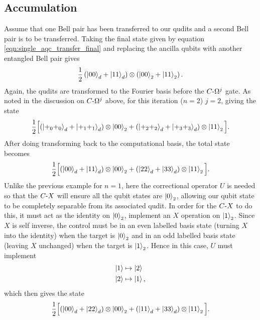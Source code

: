 \subsection{Accumulation}
\label{subsection:accumulation}
Assume that one Bell pair has been transferred to our qudits and a second Bell pair is to be transferred.
Taking the final state given by equation \ref{eqn:single_aqc_transfer_final} and replacing the ancilla qubits with another entangled Bell pair gives
\begin{equation}
    \frac{1}{2}\left(
            \ket{00}_d +\ket{11}_d
        \right)
        \otimes 
        \left(
            \ket{00}_2 +\ket{11}_2
        \right).
\end{equation}
Again, the qudits are transformed to the Fourier basis before the $C\text{-}\Omega^j$ gate.
As noted in the discussion on $C\text{-}\Omega^j$ above, for this iteration ($n=2$) $j=2$, giving the state
\begin{equation}
    \frac{1}{2}\Big[
            (\ket{+_0 +_0}_d + \ket{+_1 +_1}_d)\otimes\ket{00}_2
            +(\ket{+_2 +_2}_d + \ket{+_3 +_3}_d)\otimes\ket{11}_2
        \Big].
\end{equation}
After doing transforming back to the computational basis, the total state becomes
\begin{equation}
    \frac{1}{2}\Big[
            (\ket{00}_d + \ket{11}_d)\otimes\ket{00}_2
            +(\ket{22}_d + \ket{33}_d)\otimes\ket{11}_2
        \Big].
\end{equation}
Unlike the previous example for $n=1$, here the correctional operator $U$ is needed so that the $C\text{-}X$ will ensure all the qubit states are $\ket{0}_2$, allowing our qubit state to be completely separable from its associated qudit.
In order for the $C\text{-}X$ to do this, it must act as the identity on $\ket{0}_2$, implement an $X$ operation on $\ket{1}_2$.
Since $X$ is self inverse, the control must be in an even labelled basis state (turning $X$ into the identity) when the target is $\ket{0}_2$ and in an odd labelled basis state (leaving $X$ unchanged) when the target is $\ket{1}_2$.
Hence in this case, $U$ must implement
\begin{align}
    \ket{1} &\mapsto \ket{2}\\
    \ket{2} &\mapsto \ket{1},
\end{align}
which then gives the state
\begin{equation}
    \frac{1}{2}\Big[
            (\ket{00}_d + \ket{22}_d)\otimes\ket{00}_2
            +(\ket{11}_d + \ket{33}_d)\otimes\ket{11}_2
        \Big].
\end{equation}
